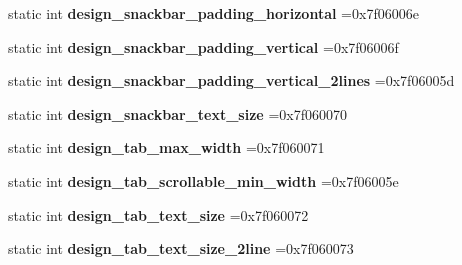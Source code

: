 \begin{DoxyCompactItemize}
static int {\bfseries design\+\_\+snackbar\+\_\+padding\+\_\+horizontal} =0x7f06006e
\item 
\mbox{\label{classandroid_1_1support_1_1v7_1_1appcompat_1_1R_1_1dimen_a5a68f77ac6d387c9326391bc38692d06}} 
static int {\bfseries design\+\_\+snackbar\+\_\+padding\+\_\+vertical} =0x7f06006f
\item 
\mbox{\label{classandroid_1_1support_1_1v7_1_1appcompat_1_1R_1_1dimen_ae34a5e5e79ea45d3fbd13443e2970f20}} 
static int {\bfseries design\+\_\+snackbar\+\_\+padding\+\_\+vertical\+\_\+2lines} =0x7f06005d
\item 
\mbox{\label{classandroid_1_1support_1_1v7_1_1appcompat_1_1R_1_1dimen_a5cacd6c50ddb8042d6163b86348f42db}} 
static int {\bfseries design\+\_\+snackbar\+\_\+text\+\_\+size} =0x7f060070
\item 
\mbox{\label{classandroid_1_1support_1_1v7_1_1appcompat_1_1R_1_1dimen_ad059f06df0dce23da4056ee06821a977}} 
static int {\bfseries design\+\_\+tab\+\_\+max\+\_\+width} =0x7f060071
\item 
\mbox{\label{classandroid_1_1support_1_1v7_1_1appcompat_1_1R_1_1dimen_ac8cea7877773ceec26386b7fbc31a680}} 
static int {\bfseries design\+\_\+tab\+\_\+scrollable\+\_\+min\+\_\+width} =0x7f06005e
\item 
\mbox{\label{classandroid_1_1support_1_1v7_1_1appcompat_1_1R_1_1dimen_ae89ab113f0346cb816a52c3deca987e8}} 
static int {\bfseries design\+\_\+tab\+\_\+text\+\_\+size} =0x7f060072
\item 
\mbox{\label{classandroid_1_1support_1_1v7_1_1appcompat_1_1R_1_1dimen_af097559df31f547c902dcb4859f55ba5}} 
static int {\bfseries design\+\_\+tab\+\_\+text\+\_\+size\+\_\+2line} =0x7f060073
\item 
\mbox{\label{classandroid_1_1support_1_1v7_1_1appcompat_1_1R_1_1dimen_a6160d736a99c571332e42c72fef9def5}} 

\end{DoxyCompactItemize}
